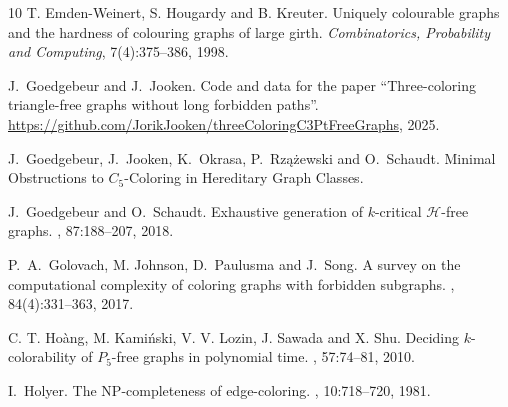 \documentclass[11pt,a4paper]{article}
\theoremstyle{definition}
\begin{document}
\begin{thebibliography}{10}
         T. Emden-Weinert, S. Hougardy and B. Kreuter.
		Uniquely colourable graphs and the hardness of colouring graphs of large girth.
		{\em Combinatorics, Probability and Computing}, 7(4):375--386, 1998.



J.~Goedgebeur and J.~Jooken.
Code and data for the
paper “Three-coloring triangle-free graphs without long forbidden paths”.
\url{https://github.com/JorikJooken/threeColoringC3PtFreeGraphs}, 2025.

        J.~Goedgebeur, J.~Jooken, K.~Okrasa, P.~Rz\k{a}\.{z}ewski and O.~Schaudt.
        \newblock Minimal Obstructions to $C_5$-Coloring in Hereditary Graph Classes.

		J.~Goedgebeur and O.~Schaudt.
		\newblock Exhaustive generation of $k$-critical $\mathcal{H}$-free graphs.
		, 87:188--207, 2018.

       P.~A.~Golovach, M. Johnson, D.~Paulusma and J.~Song.
       \newblock  A survey on the computational complexity of coloring graphs with forbidden subgraphs.
       ,  84(4):331--363, 2017.
       
       
		C. T. Ho{\`a}ng, M. Kami\'{n}ski, V. V. Lozin, J. Sawada and X. Shu.
		\newblock Deciding $k$-colorability of {$P_5$}-free graphs in polynomial time.
		, 57:74--81, 2010.
        

		I.~Holyer.
		\newblock The NP-completeness of edge-coloring.
		, 10:718--720, 1981.


\end{thebibliography}
\end{document}
